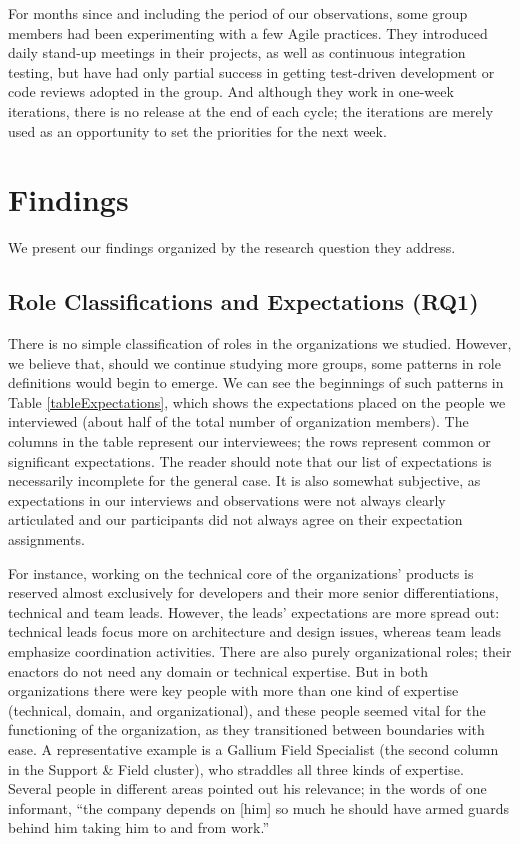 \documentclass[10pt, conference, compsocconf]{IEEEtran}
\begin{document}
For months since and including the period of our observations, some group members had been experimenting with a few Agile practices. They introduced daily stand-up meetings in their projects, as well as continuous integration testing, but have had only partial success in getting test-driven development or code reviews adopted in the group. And although they work in one-week iterations, there is no release at the end of each cycle; the iterations are merely used as an opportunity to set the priorities for the next week.




\section{Findings}

We present our findings organized by the research question they address.




\subsection{Role Classifications and Expectations (RQ1)}

There is no simple classification of roles in the organizations we studied. However, we believe that, should we continue studying more groups, some patterns in role definitions would begin to emerge. We can see the beginnings of such patterns in Table \ref{tableExpectations}, which shows the expectations placed on the people we interviewed (about half of the total number of organization members). The columns in the table represent our interviewees; the rows represent common or significant expectations. The reader should note that our list of expectations is necessarily incomplete for the general case. It is also somewhat subjective, as expectations in our interviews and observations were not always clearly articulated and our participants did not always agree on their expectation assignments.

For instance, working on the technical core of the organizations' products is reserved almost exclusively for developers and their more senior differentiations, technical and team leads. However, the leads' expectations are more spread out: technical leads focus more on architecture and design issues, whereas team leads emphasize coordination activities. There are also purely organizational roles; their enactors do not need any domain or technical expertise. But in both organizations there were key people with more than one kind of expertise (technical, domain, and organizational), and these people seemed vital for the functioning of the organization, as they transitioned between boundaries with ease. A representative example is a Gallium Field Specialist (the second column in the Support \& Field cluster), who straddles all three kinds of expertise. Several people in different areas pointed out his relevance; in the words of one informant, ``the company depends on [him] so much he should have armed guards behind him taking him to and from work.''
\end{document}
